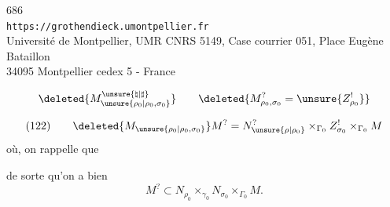 
\begin{center}
686\\
\texttt{https://grothendieck.umontpellier.fr}\\
Université de Montpellier, UMR CNRS 5149, Case courrier 051, Place Eugène Bataillon\\
34095 Montpellier cedex 5 - France
\end{center}



\[
\deleted{M_{\unsure{\rho_0|\rho_0,\sigma_0}}^{\unsure{\natural|\sharp}}}
\qquad
\deleted{M_{\rho_0,\sigma_0}^{?}=\unsure{Z_{\rho_0}^{!}}}
\]

\[
(122)\qquad
\deleted{M_{\unsure{\rho_0|\rho_0,\sigma_0}}}
M^?=N_{\unsure{\rho|\rho_0}}^?
\times_{\Gamma_0}Z_{\sigma_0}^!\times_{\Gamma_0}M
\]
où, on rappelle que


de sorte qu'on a bien
\[
M^?\subset N_{\rho_0}\times_{\gamma_0}N_{\sigma_0}
\times_{\Gamma_0}M .
\]

